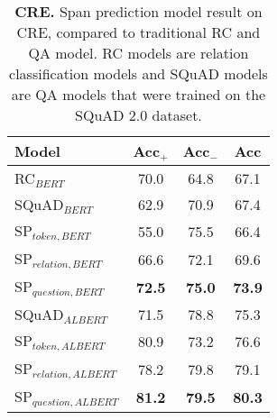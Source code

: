 \documentclass[11pt]{article}
\begin{document}
\begin{table}[t]
\centering
\begin{tabular}{l c c c}
\toprule
Model  & Acc$_+$ & Acc$_-$ & Acc \\
\midrule
\midrule
RC$_{BERT}$ & 70.0 & 64.8 & 67.1 \\
SQuAD$_{BERT}$ & 62.9 & 70.9 & 67.4 \\
SP$_{token,BERT}$ & 55.0 & 75.5 & 66.4 \\
SP$_{relation,BERT}$ & 66.6 & 72.1 & 69.6 \\
SP$_{question,BERT}$ & {\bf 72.5} & {\bf 75.0} & {\bf 73.9} \\
\midrule
\midrule
SQuAD$_{ALBERT}$ & 71.5 & 78.8 & 75.3 \\
SP$_{token,ALBERT}$ & 80.9 & 73.2 & 76.6 \\
SP$_{relation,ALBERT}$ & 78.2 & 79.8 & 79.1 \\
SP$_{question,ALBERT}$ & {\bf 81.2} & {\bf 79.5} & {\bf 80.3} \\
\bottomrule
\end{tabular} \caption{{\bf CRE.} Span prediction model result on CRE, compared to traditional RC and QA model. RC models are relation classification models and SQuAD models are QA models that were trained on the SQuAD 2.0 dataset.}
\label{tab:challange}
\end{table}

\begin{table}[t!]
\centering
{}
\caption{{\bf TACRED.} Supervised results on the  TACRED datasets. {\bf Top}: Using BERT. This is a direct comparison to the MTB span-prediction model. MTB F$_1$ is taken from the original paper. SP models (except token) suppress MTB. {\bf Bottom}: Using ALBERT. Here the reference point is KEPLLER, the current best performing model on this dataset. All the supervised SP-ALBERT models outperform KEPPLER.}
\label{tab:supervised_tacred}
\end{table}
\end{document}
